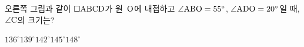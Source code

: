 \noindent\begin{minipage}[t]{0.58\linewidth}\vspace{0pt}\raggedright 오른쪽 그림과 같이 $\square\mathrm{ABCD}$가 원~$\mathrm{O}$에 내접하고 $\angle\mathrm{ABO}=55^\circ$, $\angle\mathrm{ADO}=20^\circ$일 때, $\angle\mathrm{C}$의 크기는?\end{minipage}\hfill\begin{minipage}[t]{0.4\linewidth}\vspace{0pt}\centering \resizebox{\ifdim\width>\linewidth\linewidth\else\width\fi}{!}{}\end{minipage}\par
\begin{choicesii}{$136^\circ$}{$139^\circ$}{$142^\circ$}{$145^\circ$}{$148^\circ$}\end{choicesii}
